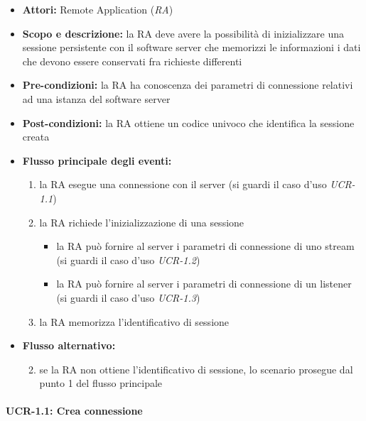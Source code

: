 \begin{itemize}
	\item \textbf{Attori:} Remote Application (\emph{RA})
	\item \textbf{Scopo e descrizione:} la RA deve avere la possibilità di inizializzare una sessione persistente con il software server che memorizzi le informazioni i dati che devono essere conservati fra richieste differenti
	\item \textbf{Pre-condizioni:} la RA ha conoscenza dei parametri di connessione relativi ad una istanza del software server
	\item \textbf{Post-condizioni:} la RA ottiene un codice univoco che identifica la sessione creata
	\item \textbf{Flusso principale degli eventi:}
		\begin{enumerate}
			\item la RA esegue una connessione con il server (si guardi il caso d'uso \emph{UCR-1.1})
			\item la RA richiede l'inizializzazione di una sessione
				\begin{itemize}
					\item la RA può fornire al server i parametri di connessione di uno stream (si guardi il caso d'uso \emph{UCR-1.2})
					\item la RA può fornire al server i parametri di connessione di un listener (si guardi il caso d'uso \emph{UCR-1.3})
				\end{itemize}
			\item la RA memorizza l'identificativo di sessione
		\end{enumerate}
	\item \textbf{Flusso alternativo:}
		\begin{enumerate}
			\setcounter{enumi}{1}
			\item se la RA non ottiene l'identificativo di sessione, lo scenario prosegue dal punto 1 del flusso principale
		\end{enumerate}
\end{itemize}


\paragraph{UCR-1.1: Crea connessione}

